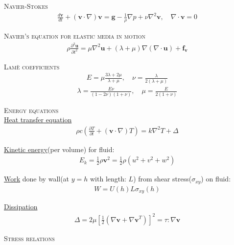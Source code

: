 \documentclass[11pt,a4paper,english]{article}
\begin{document}
{\scshape Navier-Stokes} 
\begin{align*}
\frac{d \mathbf{v}}{dt} + (\mathbf{v} \cdot \nabla)\mathbf{v} = \mathbf{g} - \frac{1}{\rho} \nabla p + \nu \nabla^2 \mathbf{v}, \quad \nabla \cdot \mathbf{v} = 0  
\end{align*}

{\scshape Navier's equation for elastic media in motion} \\
\begin{align*}
\rho \frac{\partial^2 \mathbf{u}}{\partial t^2} = \mu \nabla^2 \mathbf{u} + (\lambda + \mu) \nabla ( \nabla \cdot \mathbf{u}) + \mathbf{f_v}
\end{align*}

{\scshape Lamè coefficients} 
\begin{align*}
E=\mu \frac{3\lambda + 2\mu}{\lambda + \mu}, \quad \nu = \frac{\lambda}{2(\lambda + \mu)}
\end{align*}
\begin{align*}
\lambda = \frac{E \nu}{(1-2\nu)(1+\nu)}, \quad \mu = \frac{E}{2(1+\nu)}
\end{align*}

\vspace{1cm}

{\scshape Energy equations} \\

\underline{Heat transfer equation}
\begin{align*}
\rho c \left(\frac{\partial T}{\partial t} + (\mathbf{v} \cdot \nabla)T \right) = k \nabla^2 T + \Delta 
\end{align*}

\underline{Kinetic energy}(per volume) for fluid:
\begin{align*}
E_k = \frac{1}{2} \rho \mathbf{v}^2 = \frac{1}{2} \rho (u^2 + v^2 + w^2) 
\end{align*}

\underline{Work} done by wall(at $y=h$ with length: $L$) from shear stress($\sigma_{xy}$) on fluid:
\begin{align*}
W = U(h) L \sigma_{xy}(h)
\end{align*}

\underline{Dissipation}
\begin{align*}
\Delta = 2 \mu [\frac{1}{2} (\nabla \mathbf{v}  + \nabla \mathbf{v}^T  ) ]^2 = \tau : \nabla \mathbf{v}
\end{align*}

\vspace{1cm}

{\scshape Stress relations} \\
\end{document}
